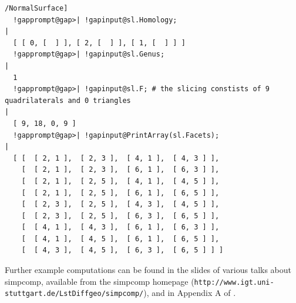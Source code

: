 \documentclass[a4paper,11pt]{report}
\begin{document}
{{\begin{Verbatim}[commandchars=!@|,fontsize=\small,frame=single,label=Example]
  /NormalSurface]
  !gapprompt@gap>| !gapinput@sl.Homology;
|
  [ [ 0, [  ] ], [ 2, [  ] ], [ 1, [  ] ] ]
  !gapprompt@gap>| !gapinput@sl.Genus;
|
  1
  !gapprompt@gap>| !gapinput@sl.F; # the slicing constists of 9 quadrilaterals and 0 triangles
|
  [ 9, 18, 0, 9 ]
  !gapprompt@gap>| !gapinput@PrintArray(sl.Facets);
|
  [ [  [ 2, 1 ],  [ 2, 3 ],  [ 4, 1 ],  [ 4, 3 ] ],
    [  [ 2, 1 ],  [ 2, 3 ],  [ 6, 1 ],  [ 6, 3 ] ],
    [  [ 2, 1 ],  [ 2, 5 ],  [ 4, 1 ],  [ 4, 5 ] ],
    [  [ 2, 1 ],  [ 2, 5 ],  [ 6, 1 ],  [ 6, 5 ] ],
    [  [ 2, 3 ],  [ 2, 5 ],  [ 4, 3 ],  [ 4, 5 ] ],
    [  [ 2, 3 ],  [ 2, 5 ],  [ 6, 3 ],  [ 6, 5 ] ],
    [  [ 4, 1 ],  [ 4, 3 ],  [ 6, 1 ],  [ 6, 3 ] ],
    [  [ 4, 1 ],  [ 4, 5 ],  [ 6, 1 ],  [ 6, 5 ] ],
    [  [ 4, 3 ],  [ 4, 5 ],  [ 6, 3 ],  [ 6, 5 ] ] ]
\end{Verbatim}
}

 Further example computations can be found in the slides of various talks about \textsf{simpcomp}, available from the \textsf{simpcomp} homepage (\texttt{http://www.igt.uni-stuttgart.de/LstDiffgeo/simpcomp/}), and in Appendix A of \cite{Spreer10Diss}. }

 
\end{document}
